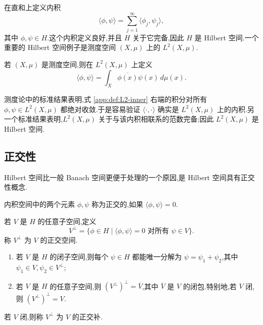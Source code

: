 在直和上定义内积
\[
\langle\phi,\psi\rangle=\sum_{j=1}^{\infty}\langle\phi_j,\psi_j\rangle,\tag{A.9}
\]
其中 \(\phi,\psi\in H\).这个内积定义良好,并且 \(H\) 关于它完备,因此 \(H\) 是 Hilbert 空间.一个重要的 Hilbert 空间例子是测度空间 \((X,\mu)\) 上的 \(L^2(X,\mu)\).

\begin{definition}[\(L^2\) 空间的内积]\label{app:def:L2-inner}
若 \((X,\mu)\) 是测度空间,则在 \(L^2(X,\mu)\) 上定义
\[
\langle\phi,\psi\rangle=\int_X\overline{\phi(x)}\psi(x)\,d\mu(x).\tag{A.10}
\]
\end{definition}

测度论中的标准结果表明,式 \ref{app:def:L2-inner} 右端的积分对所有 \(\phi,\psi\in L^2(X,\mu)\) 都绝对收敛.于是容易验证 \(\langle\cdot,\cdot\rangle\) 确实是 \(L^2(X,\mu)\) 上的内积.另一个标准结果表明,\(L^2(X,\mu)\) 关于与该内积相联系的范数完备;因此 \(L^2(X,\mu)\) 是 Hilbert 空间.

\subsection{正交性}

Hilbert 空间比一般 Banach 空间更便于处理的一个原因,是 Hilbert 空间具有正交性概念.

\begin{definition}[正交]\label{app:def:orthogonal}
内积空间中的两个元素 \(\phi,\psi\) 称为正交的,如果 \(\langle\phi,\psi\rangle=0\).
\end{definition}

\begin{definition}[正交空间]\label{app:def:orthogonal-space}
若 \(V\) 是 \(H\) 的任意子空间,定义
\[
V^\perp=\{\phi\in H\mid\langle\phi,\psi\rangle=0\text{ 对所有 }\psi\in V\}.
\]
称 \(V^\perp\) 为 \(V\) 的正交空间.
\end{definition}

\begin{proposition}[正交分解]\label{app:prop:orthogonal-decomposition}
\begin{enumerate}
  \item 若 \(V\) 是 \(H\) 的闭子空间,则每个 \(\psi\in H\) 都能唯一分解为 \(\psi=\psi_1+\psi_2\),其中 \(\psi_1\in V,\psi_2\in V^\perp\);
  \item 若 \(V\) 是 \(H\) 的任意子空间,则 \((V^\perp)^\perp=\overline V\),其中 \(\overline V\) 是 \(V\) 的闭包.特别地,若 \(V\) 闭,则 \((V^\perp)^\perp=V\).
\end{enumerate}
若 \(V\) 闭,则称 \(V^\perp\) 为 \(V\) 的正交补.
\end{proposition}

